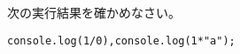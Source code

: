 \begin{Prob}\upshape\Must\label{overflow}
 次の実行結果を確かめなさい。

 \texttt{console.log(1/0),console.log(1*"a");}%
\end{Prob}
